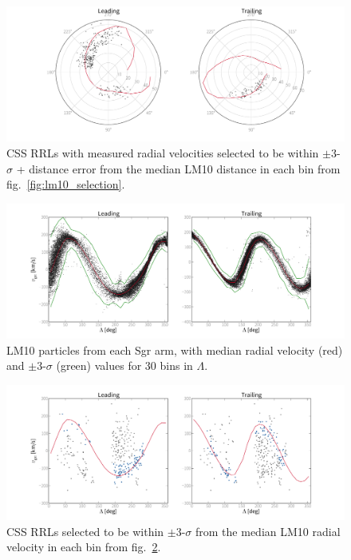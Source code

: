\documentclass[letterpaper,12pt,preprint]{aastex}
\begin{document}
\begin{figure}
\begin{center}
\includegraphics[width=\textwidth]{css_selection_vgsr.pdf}
\caption{ CSS RRLs with measured radial velocities selected to be within $\pm$3-$\sigma$ + distance error from the median LM10 distance in each bin from fig.~\ref{fig:lm10_selection}. }\label{fig:css_selection}
\end{center}
\end{figure}

\begin{figure}
\begin{center}
\includegraphics[width=\textwidth]{lm10_vgsr_selection.pdf}
\caption{ LM10 particles from each Sgr arm, with median radial velocity (red) and $\pm$3-$\sigma$ (green) values for 30 bins in $\Lambda$. }\label{fig:lm10_vgsr}
\end{center}
\end{figure}

\begin{figure}
\begin{center}
\includegraphics[width=\textwidth]{css_selection_from_vgsr.pdf}
\caption{ CSS RRLs selected to be within $\pm$3-$\sigma$ from the median LM10 radial velocity in each bin from fig.~\ref{fig:lm10_vgsr}. }\label{fig:css_vgsr}
\end{center}
\end{figure}
\end{document}
